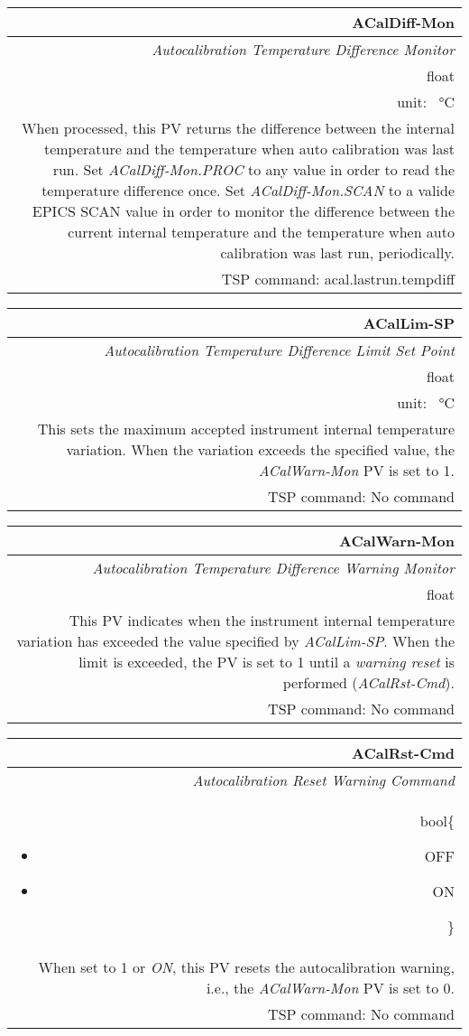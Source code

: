 \documentclass[openany]{article}
\begin{document}
		\begin{tabular}{N}
			\hline
			\bfseries ACalDiff-Mon\label{pv:acaldiff-mon} \\ \hline
			\emph{Autocalibration Temperature Difference Monitor} \\
			float \\
			unit: \SI{}{\degreeCelsius} \\
			When processed, this PV returns the difference between the internal temperature and the temperature when auto calibration was last run. Set \emph{ACalDiff-Mon.PROC} to any value in order to read the temperature difference once. Set \emph{ACalDiff-Mon.SCAN} to a valide EPICS SCAN value in order to monitor the difference between the current internal temperature and the temperature when auto calibration was last run, periodically. \\
			TSP command: acal.lastrun.tempdiff
		\end{tabular}

		\begin{tabular}{N}
			\hline
			\bfseries ACalLim-SP\label{pv:acallim-sp} \\ \hline
			\emph{Autocalibration Temperature Difference Limit Set Point} \\
			float \\
			unit: \SI{}{\degreeCelsius} \\
			This sets the maximum accepted instrument internal temperature variation. When the variation exceeds the specified value, the \emph{ACalWarn-Mon} PV is set to 1. \\
			TSP command: No command
		\end{tabular}

		\begin{tabular}{N}
			\hline
			\bfseries ACalWarn-Mon\label{pv:acalwarn-mon} \\ \hline
			\emph{Autocalibration Temperature Difference Warning Monitor} \\
			float \\
			This PV indicates when the instrument internal temperature variation has exceeded the value specified by \emph{ACalLim-SP}. When the limit is exceeded, the PV is set to 1 until a \emph{warning reset} is performed (\emph{ACalRst-Cmd}). \\
			TSP command: No command
		\end{tabular}

		\begin{tabular}{N}
			\hline
			\bfseries ACalRst-Cmd\label{pv:acalrst-cmd} \\ \hline
			\emph{Autocalibration Reset Warning Command} \\
			bool\{\begin{itemize}[noitemsep]
				\small
				\item[] OFF
				\item[] ON
			\end{itemize}\} \\
			When set to 1 or \emph{ON}, this PV resets the autocalibration warning, i.e., the \emph{ACalWarn-Mon} PV is set to 0. \\
			TSP command: No command
		\end{tabular}
\end{document}
